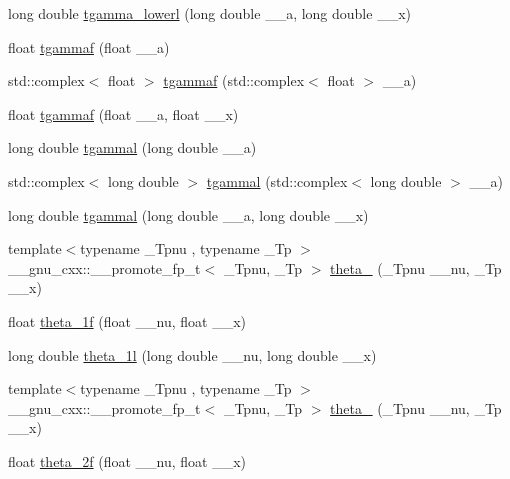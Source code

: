 \begin{DoxyCompactItemize}
\item 
long double \hyperlink{group__gnu__math__spec__func_gad057fe49a5bf95b1550f5f0a6e60bb19}{tgamma\+\_\+lowerl} (long double \+\_\+\+\_\+a, long double \+\_\+\+\_\+x)
\item 
float \hyperlink{group__gnu__math__spec__func_ga008b1f4cc3a54c9c8221ad1f3504b593}{tgammaf} (float \+\_\+\+\_\+a)
\item 
std\+::complex$<$ float $>$ \hyperlink{group__gnu__math__spec__func_gaf548b80db1501cbc067de1564e721972}{tgammaf} (std\+::complex$<$ float $>$ \+\_\+\+\_\+a)
\item 
float \hyperlink{group__gnu__math__spec__func_ga942773871e9c21a50cf13ec160e7e8d9}{tgammaf} (float \+\_\+\+\_\+a, float \+\_\+\+\_\+x)
\item 
long double \hyperlink{group__gnu__math__spec__func_ga2c7d954852d84665aabd43566d67e344}{tgammal} (long double \+\_\+\+\_\+a)
\item 
std\+::complex$<$ long double $>$ \hyperlink{group__gnu__math__spec__func_ga8d53515dba9c860fd6058a4b75aaff58}{tgammal} (std\+::complex$<$ long double $>$ \+\_\+\+\_\+a)
\item 
long double \hyperlink{group__gnu__math__spec__func_gabebff9ffba6acf55f3a3cd716ef5007a}{tgammal} (long double \+\_\+\+\_\+a, long double \+\_\+\+\_\+x)
\item 
{\footnotesize template$<$typename \+\_\+\+Tpnu , typename \+\_\+\+Tp $>$ }\\\+\_\+\+\_\+gnu\+\_\+cxx\+::\+\_\+\+\_\+promote\+\_\+fp\+\_\+t$<$ \+\_\+\+Tpnu, \+\_\+\+Tp $>$ \hyperlink{group__gnu__math__spec__func_gac122af3ffd2e5536fdf021afce79b7d4}{theta\+\_} (\+\_\+\+Tpnu \+\_\+\+\_\+nu, \+\_\+\+Tp \+\_\+\+\_\+x)
\item 
float \hyperlink{group__gnu__math__spec__func_ga5bbf256b875da28132f9049f5984cb14}{theta\+\_\+1f} (float \+\_\+\+\_\+nu, float \+\_\+\+\_\+x)
\item 
long double \hyperlink{group__gnu__math__spec__func_ga3520684c78771ffa57180060c8b6d1ca}{theta\+\_\+1l} (long double \+\_\+\+\_\+nu, long double \+\_\+\+\_\+x)
\item 
{\footnotesize template$<$typename \+\_\+\+Tpnu , typename \+\_\+\+Tp $>$ }\\\+\_\+\+\_\+gnu\+\_\+cxx\+::\+\_\+\+\_\+promote\+\_\+fp\+\_\+t$<$ \+\_\+\+Tpnu, \+\_\+\+Tp $>$ \hyperlink{group__gnu__math__spec__func_gacec36dc316e561bbaa371c60c06e52f7}{theta\+\_} (\+\_\+\+Tpnu \+\_\+\+\_\+nu, \+\_\+\+Tp \+\_\+\+\_\+x)
\item 
float \hyperlink{group__gnu__math__spec__func_ga78e832796aedf5159b142801e1184392}{theta\+\_\+2f} (float \+\_\+\+\_\+nu, float \+\_\+\+\_\+x)

\end{DoxyCompactItemize}
